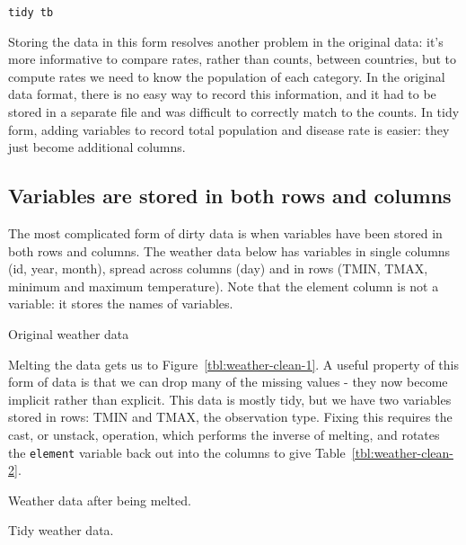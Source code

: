 \documentclass[oneside]{article}
\begin{document}
\begin{verbatim}
tidy tb
\end{verbatim}

Storing the data in this form resolves another problem in the original data: it's more informative to compare rates, rather than counts, between countries, but to compute rates we need to know the population of each category. In the original data format, there is no easy way to record this information, and it had to be stored in a separate file and was difficult to correctly match to the counts. In tidy form, adding variables to record total population and disease rate is easier: they just become additional columns.

\subsection{Variables are stored in both rows and columns}

The most complicated form of dirty data is when variables have been stored in both rows and columns. The weather data below has variables in single columns (id, year, month), spread across columns (day) and in rows (TMIN, TMAX, minimum and maximum temperature).  Note that the element column is not a variable: it stores the names of variables.

\begin{table}[htbp]
  \centering
  
  \caption{Original weather data}
  \label{tbl:weather-raw}
\end{table}

Melting the data gets us to Figure~\ref{tbl:weather-clean-1}.  A useful property of this form of data is that we can drop many of the missing values - they now become implicit rather than explicit. This data is mostly tidy, but we have two variables stored in rows: TMIN and TMAX, the observation type. Fixing this requires the cast, or unstack, operation, which performs the inverse of melting, and rotates the {\tt element} variable back out into the columns to give Table~\ref{tbl:weather-clean-2}.

\begin{table}[htbp]
  \centering
  
  \caption{Weather data after being melted.}
  \label{tbl:weather-clean-1}
\end{table}

\begin{table}[htbp]
  \centering
  
  \caption{Tidy weather data.}
  \label{tbl:weather-clean-2}
\end{table}
\end{document}
